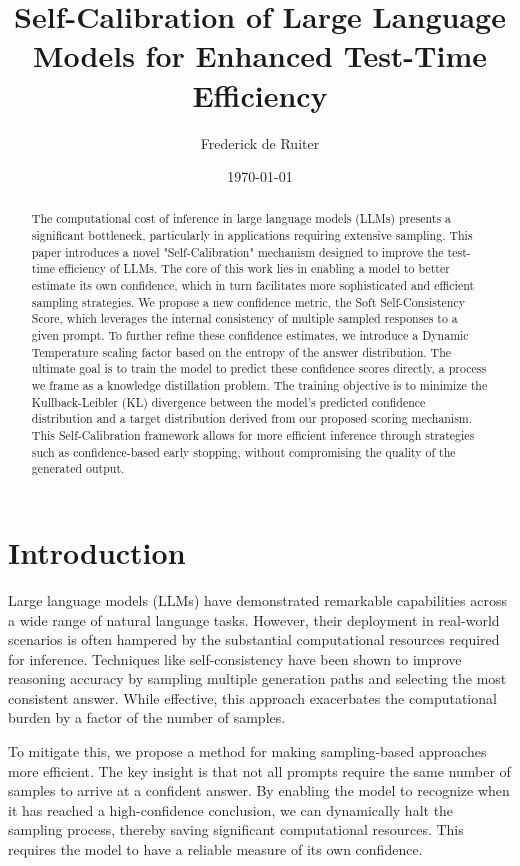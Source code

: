 \documentclass{article}
\title{Self-Calibration of Large Language Models for Enhanced Test-Time Efficiency}
\author{Frederick de Ruiter}
\date{\today}
\begin{document}
\maketitle

\begin{abstract}
The computational cost of inference in large language models (LLMs) presents a significant bottleneck, particularly in applications requiring extensive sampling. This paper introduces a novel "Self-Calibration" mechanism designed to improve the test-time efficiency of LLMs. The core of this work lies in enabling a model to better estimate its own confidence, which in turn facilitates more sophisticated and efficient sampling strategies. We propose a new confidence metric, the Soft Self-Consistency Score, which leverages the internal consistency of multiple sampled responses to a given prompt. To further refine these confidence estimates, we introduce a Dynamic Temperature scaling factor based on the entropy of the answer distribution. The ultimate goal is to train the model to predict these confidence scores directly, a process we frame as a knowledge distillation problem. The training objective is to minimize the Kullback-Leibler (KL) divergence between the model's predicted confidence distribution and a target distribution derived from our proposed scoring mechanism. This Self-Calibration framework allows for more efficient inference through strategies such as confidence-based early stopping, without compromising the quality of the generated output.
\end{abstract}

\section{Introduction}
Large language models (LLMs) have demonstrated remarkable capabilities across a wide range of natural language tasks. However, their deployment in real-world scenarios is often hampered by the substantial computational resources required for inference. Techniques like self-consistency \cite{wang2022self} have been shown to improve reasoning accuracy by sampling multiple generation paths and selecting the most consistent answer. While effective, this approach exacerbates the computational burden by a factor of the number of samples.

To mitigate this, we propose a method for making sampling-based approaches more efficient. The key insight is that not all prompts require the same number of samples to arrive at a confident answer. By enabling the model to recognize when it has reached a high-confidence conclusion, we can dynamically halt the sampling process, thereby saving significant computational resources. This requires the model to have a reliable measure of its own confidence.
\end{document}
